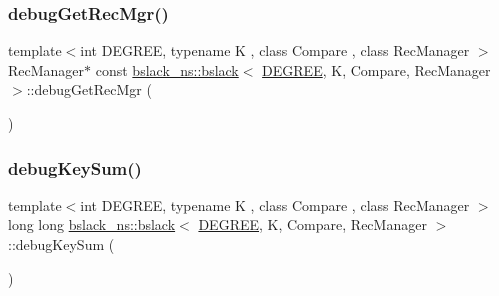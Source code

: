 \mbox{\label{classbslack__ns_1_1bslack_a957555a6a1a9fe89a4d23e7961e87c3d}} 
\subsubsection{\texorpdfstring{debug\+Get\+Rec\+Mgr()}{debugGetRecMgr()}}
{\footnotesize\ttfamily template$<$int D\+E\+G\+R\+EE, typename K , class Compare , class Rec\+Manager $>$ \\
Rec\+Manager$\ast$ const \hyperlink{classbslack__ns_1_1bslack}{bslack\+\_\+ns\+::bslack}$<$ \hyperlink{brown__sigouin__abtree__kcas_2adapter_8h_a5d88b17d70c985f2f2b8e987037fd6dd}{D\+E\+G\+R\+EE}, K, Compare, Rec\+Manager $>$\+::debug\+Get\+Rec\+Mgr (\begin{DoxyParamCaption}{ }\end{DoxyParamCaption})\hspace{0.3cm}{\ttfamily [inline]}}

\mbox{\label{classbslack__ns_1_1bslack_a609ab93b6e3788584c5e9504d6463b02}} 
\subsubsection{\texorpdfstring{debug\+Key\+Sum()}{debugKeySum()}}
{\footnotesize\ttfamily template$<$int D\+E\+G\+R\+EE, typename K , class Compare , class Rec\+Manager $>$ \\
long long \hyperlink{classbslack__ns_1_1bslack}{bslack\+\_\+ns\+::bslack}$<$ \hyperlink{brown__sigouin__abtree__kcas_2adapter_8h_a5d88b17d70c985f2f2b8e987037fd6dd}{D\+E\+G\+R\+EE}, K, Compare, Rec\+Manager $>$\+::debug\+Key\+Sum (\begin{DoxyParamCaption}{ }\end{DoxyParamCaption})\hspace{0.3cm}{\ttfamily [inline]}}

\mbox{\label{classbslack__ns_1_1bslack_a095d4f4661d03b7515845262bdaef196}} 
